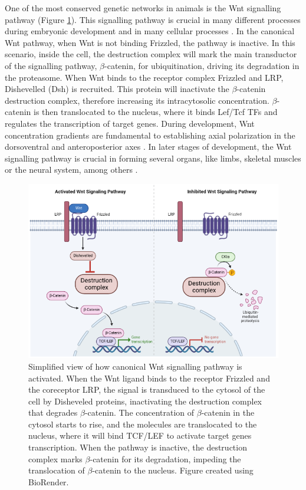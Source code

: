 One of the most conserved genetic networks in animals is the Wnt signalling pathway (Figure \ref{fig:Intro_wnt}). This signalling pathway is crucial in many different processes during embryonic development and in many cellular processes \parencite{steinhart_wnt_2018}. In the canonical Wnt pathway, when Wnt is not binding Frizzled, the pathway is inactive. In this scenario, inside the cell, the destruction complex will mark the main transductor of the signalling pathway, $\beta$-catenin, for ubiquitination, driving its degradation in the proteasome. When Wnt binds to the receptor complex Frizzled and LRP, Dishevelled (Dsh) is recruited. This protein will inactivate the $\beta$-catenin destruction complex, therefore increasing its intracytosolic concentration. $\beta$-catenin is then translocated to the nucleus, where it binds Lef/Tcf TFs and regulates the transcription of target genes. During development, Wnt concentration gradients are fundamental to establishing axial polarization in the dorsoventral and anteroposterior axes \parencite{niehrs_growth_2010, green_vertebrate_2015, genikhovich_evolution_2017}. In later stages of development, the Wnt signalling pathway is crucial in forming several organs, like limbs, skeletal muscles or the neural system, among others \parencite{brafman_wnt-catenin_2017, bertrand_developmental_2017, teufel_chapter_2019}. 




\begin{figure}[h!]
\centering
\includegraphics[width=1\textwidth]{Figures/Intro/Wnt_signalling.png}
\caption[Wnt pathway]{ Simplified view of how canonical Wnt signalling pathway is activated. When the Wnt ligand binds to the receptor Frizzled and the coreceptor LRP, the signal is transduced to the cytosol of the cell by Disheveled proteins, inactivating the destruction complex that degrades $\beta$-catenin. The concentration of $\beta$-catenin in the cytosol starts to rise, and the molecules are translocated to the nucleus, where it will bind TCF/LEF to activate target genes transcription. When the pathway is inactive, the destruction complex marks $\beta$-catenin for its degradation, impeding the translocation of $\beta$-catenin to the nucleus. Figure created using BioRender.}
\label{fig:Intro_wnt}
\end{figure} 

